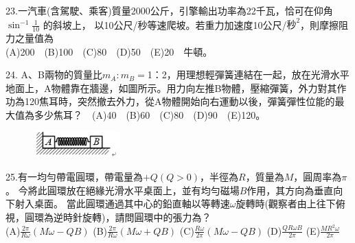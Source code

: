 \documentclass[cn,10pt,math=newtx,chinesefont=founder,device=ig]{elegantbook}
\begin{document}
\newpage


\begin{example}
  23.一汽車(含駕駛、乘客)質量2000公斤，引擎輸出功率為22千瓦，恰可在仰角$\sin^{-1}{\frac{1}{10}}$ 的斜坡上，
  以10公尺/秒等速爬坡。若重力加速度10公尺/$秒^2$，則摩擦阻力之量值為\\
  (A)200　(B)100　(C)80　(D)50　(E)20　牛頓。
\\
    \rightline{[成德高中教甄109]}
\end{example}
\begin{solution}
    
\end{solution}

\newpage


\begin{example}
   24. A、B兩物的質量比$m_A:m_B=$1：2，用理想輕彈簧連結在一起，放在光滑水平地面上，A物體靠在牆邊，如圖所示。用力向左推B物體，壓縮彈簧，外力對其作功為120焦耳時，突然撤去外力，從A物體開始向右運動以後，彈簧彈性位能的最大值為多少焦耳？　(A)40　(B)60　(C)80　(D)90　(E)120。\\
    \rightline{[成德高中教甄109]}
\end{example}
\begin{solution}
    
\end{solution}
\begin{figure}[htbp]
    \flushright
    \includegraphics[width=0.3\textwidth]{image/109成德24.png}
  \end{figure}
\newpage



\begin{example}
   25.有一均勻帶電圓環，帶電量為$+Q(Q>0)$，半徑為$R$，質量為$M$，圓周率為$\pi$。
   今將此圓環放在絕緣光滑水平桌面上，並有均勻磁場$B$作用，其方向為垂直向下射入桌面。
   當此圓環通過其中心的鉛直軸以等轉速$\omega$旋轉時(觀察者由上往下俯視，圓環為逆時針旋轉)，請問圓環中的張力為？\\
   (A)$\frac{2\pi}{R\omega}(M\omega-QB)$ (B)$\frac{2\pi}{R\omega}(M\omega+QB)$ 
   (C)$\frac{R\omega}{2\pi}(M\omega-QB)$ (D)$\frac{QR\omega B}{2\pi}$ (E)$\frac{MR^2\omega}{2\pi}$
   \\
    \rightline{[成德高中教甄109]}
\end{example}
\begin{solution}
    
\end{solution}
\end{document}
